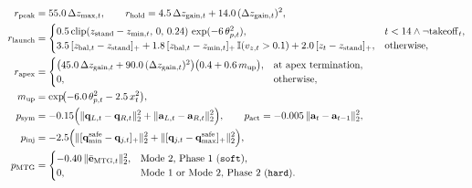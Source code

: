 \begin{align}
r_{\mathrm{peak}} &= 55.0\,\Delta z_{\max,t}, \qquad
r_{\mathrm{hold}} = 4.5\,\Delta z_{\mathrm{gain},t} + 14.0\,(\Delta z_{\mathrm{gain},t})^2, \\
r_{\mathrm{launch}} &=
\begin{cases}
0.5\,\mathrm{clip}(z_{\mathrm{stand}} - z_{\min,t},\,0,\,0.24)\,\exp(-6\,\theta_{p,t}^2), & t < 14 \land \neg\mathrm{takeoff}_t, \\
3.5\,[z_{\mathrm{bal},t} - z_{\mathrm{stand}}]_+ + 1.8\,[z_{\mathrm{bal},t} - z_{\min,t}]_+\,\mathbb{I}(v_{z,t} > 0.1) + 2.0\,[z_t - z_{\mathrm{stand}}]_+, & \text{otherwise},
\end{cases} \\
r_{\mathrm{apex}} &=
\begin{cases}
\bigl(45.0\,\Delta z_{\mathrm{gain},t} + 90.0\,(\Delta z_{\mathrm{gain},t})^2\bigr)\bigl(0.4 + 0.6\,m_{\mathrm{up}}\bigr), & \text{at apex termination}, \\
0, & \text{otherwise},
\end{cases} \\
m_{\mathrm{up}} &= \exp\!\bigl(-6.0\,\theta_{p,t}^2 - 2.5\,x_t^2\bigr), \\
p_{\mathrm{sym}} &= -0.15\Bigl(\lVert \mathbf{q}_{L,t} - \mathbf{q}_{R,t} \rVert_2^2 + \lVert \mathbf{a}_{L,t} - \mathbf{a}_{R,t} \rVert_2^2\Bigr), \qquad
p_{\mathrm{act}} = -0.005\,\lVert \mathbf{a}_t - \mathbf{a}_{t-1} \rVert_2^2, \\
p_{\mathrm{inj}} &= -2.5\Bigl(\lVert [\mathbf{q}_{\min}^{\mathrm{safe}} - \mathbf{q}_{j,t}]_+ \rVert_2^2 + \lVert [\mathbf{q}_{j,t} - \mathbf{q}_{\max}^{\mathrm{safe}}]_+ \rVert_2^2\Bigr), \\
p_{\mathrm{MTG}} &=
\begin{cases}
-0.40\,\lVert \bar{\mathbf{e}}_{\mathrm{MTG},t} \rVert_2^2, & \text{Mode 2, Phase 1 (\texttt{soft})}, \\
0, & \text{Mode 1 or Mode 2, Phase 2 (\texttt{hard})}.
\end{cases}
\end{align}
